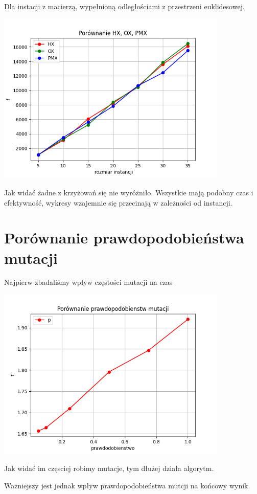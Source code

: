 \documentclass{article}
\begin{document}
    Dla instacji z macierzą, wypełnioną odległościami z przestrzeni
    euklidesowej.

    \includegraphics[width=11cm]{./spr3img/Figure_3.png}

   Jak widać żadne z krzyżowań się nie wyróżniło. Wszystkie mają podobny
   czas i efektywność, wykresy wzajemnie się przecinają w zależności od
   instancji.

    \section{Porównanie prawdopodobieństwa mutacji}

    Najpierw zbadaliśmy wpływ częstości mutacji na czas

    \includegraphics[width=11cm]{./spr3img/Figure_5.png}

    Jak widać im częsciej robimy mutacje, tym dłużej działa algorytm.

    Ważniejszy jest jednak wpływ prawdopodobieństwa mutcji na końcowy wynik.
\end{document}
